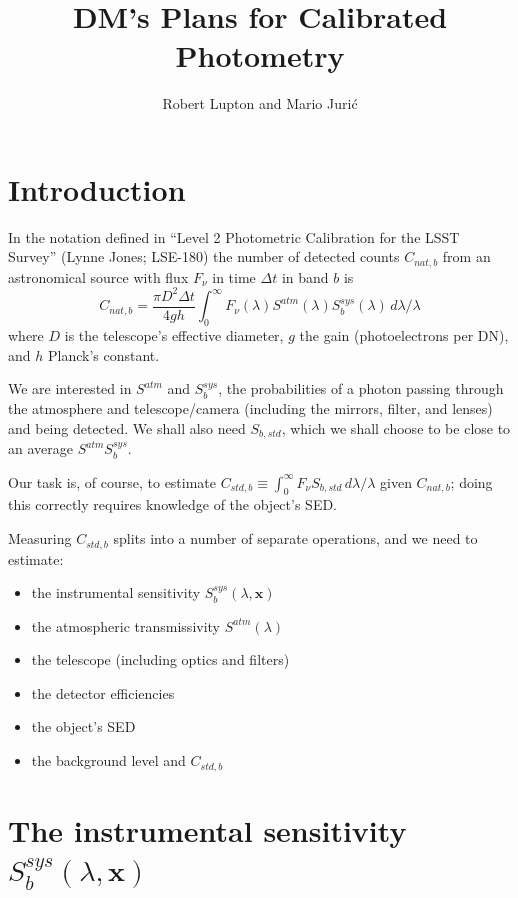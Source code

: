 \documentclass[12pt]{article}
\newcommand{\xb}{{\boldsymbol x}}
\begin{document}
\title{DM's Plans for Calibrated Photometry}
\author{Robert Lupton and Mario Juri\'c}
\maketitle
\tableofcontents

\section{Introduction}

In the notation defined in
``Level 2 Photometric Calibration for the LSST Survey'' (Lynne Jones; LSE-180)
the number of detected counts $C_{nat, b}$ from an astronomical source with flux
$F_\nu$ in time $\Delta t$ in band $b$ is
$$
C_{nat, b} = \frac{\pi D^2 \Delta t}{4 g h} \int_0^\infty F_\nu(\lambda)
                                                   S^{atm}(\lambda) S_b^{sys}(\lambda) \,d\lambda/\lambda
$$
where $D$ is the telescope's effective diameter, $g$ the gain (photoelectrons per DN),
and $h$ Planck's constant.

We are interested in $S^{atm}$ and $S_b^{sys}$, the probabilities of a photon passing through 
the atmosphere and telescope/camera (including the mirrors, filter, and lenses) and being detected.  We shall
also need $S_{b, std}$, which we shall choose to be close to an average $S^{atm} S_b^{sys}$.

Our task is, of course, to estimate $C_{std, b} \equiv \int_0^\infty F_\nu S_{b, std} \,d\lambda/\lambda$
given $C_{nat, b}$; doing this correctly requires knowledge of the object's SED.

Measuring $C_{std, b}$ splits into a number of separate operations, and we need to estimate:
\begin{itemize}
\item
  the instrumental sensitivity $S_b^{sys}(\lambda, \xb)$
\item
  the atmospheric transmissivity $S^{atm}(\lambda)$
\item
  the telescope (including optics and filters)
\item
  the detector efficiencies
\item
  the object's SED
\item
  the background level and $C_{std, b}$
\end{itemize}

\section{The instrumental sensitivity $S_b^{sys}(\lambda, \xb)$}
\label{secInstrumental}
\end{document}

